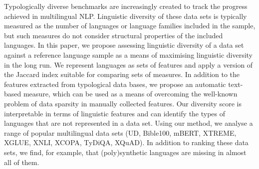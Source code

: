 Typologically diverse benchmarks are increasingly created to track the progress achieved in multilingual NLP. Linguistic diversity of these data sets is typically measured as the number of languages or language families included in the sample, but such measures do not consider structural properties of the included languages. In this paper, we propose assessing linguistic diversity of a data set against a reference language sample as a means of maximising linguistic diversity in the long run. We represent languages as sets of features and apply a version of the Jaccard index suitable for comparing sets of measures. In addition to the features extracted from typological data bases, we propose an automatic text-based measure, which can be used as a means of overcoming the well-known problem of data sparsity in manually collected features. Our diversity score is interpretable in terms of linguistic features and can identify the types of languages that are not represented in a data set. Using our method, we analyse a range of popular multilingual data sets (UD, Bible100, mBERT, XTREME, XGLUE, XNLI, XCOPA, TyDiQA, XQuAD). In addition to ranking these data sets, we find, for example, that (poly)synthetic languages are missing in almost all of them.